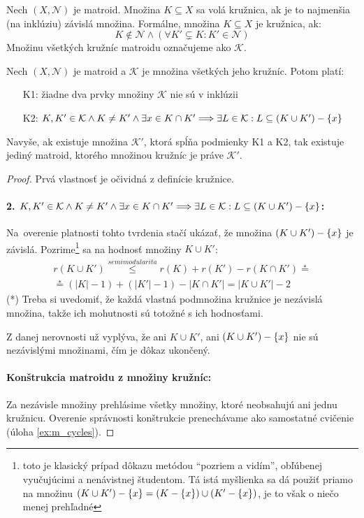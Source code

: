 \begin{definition}
Nech $(X, \mathcal{N})$ je matroid. Množina $K \subseteq X$ sa volá kružnica, ak je to najmenšia (na inklúziu) závislá množina. Formálne,
množina $K \subseteq X$ je kružnica, ak:
$$ K \not\in\mathcal{N} \wedge \left(\forall K' \subsetneq K: K' \in\mathcal{N} \right)$$ 
\noindent
Množinu všetkých kružníc matroidu označujeme ako $\mathcal{K}$.
\end{definition}

\begin{theorem}
\label{th:m_cycles}
Nech $(X, \mathcal{N})$ je matroid a $\mathcal{K}$ je množina všetkých jeho kružníc. Potom platí:
\begin{enumerate}
    \item[K1:] žiadne dva prvky množiny $\mathcal{K}$ nie sú v inklúzii
    \item[K2:] $K, K' \in \mathcal{K} \wedge K \neq K' \wedge \exists x \in K \cap K' \Longrightarrow \exists L \in \mathcal{K}: L \subseteq (K \cup K') - \left\{x\right\}$
\end{enumerate}

Navyše, ak existuje množina $\mathcal{K}'$, ktorá spĺňa podmienky K1 a K2, tak existuje jediný matroid, ktorého množinou kružníc je práve $\mathcal{K}'$.
\end{theorem}
\begin{proof}
Prvá vlastnosť je očividná z definície kružnice.
\paragraph{2. $K, K' \in \mathcal{K} \wedge K \neq K' \wedge \exists x \in K \cap K' \Longrightarrow \exists L \in \mathcal{K}: L \subseteq (K \cup K') - \left\{x\right\}$:}
Na~overenie platnosti tohto tvrdenia stačí ukázať, že množina $(K \cup K') - \left\{x\right\}$ je závislá.
Pozrime\footnote{toto je klasický prípad dôkazu metódou ``pozriem a vidím'', obľúbenej vyučujúcimi a nenávistnej študentom. Tá istá myšlienka sa dá použiť priamo na množinu $(K \cup K') - \left\{x\right\} = (K - \left\{x\right\}) \cup (K' - \left\{x\right\})$, je to však o niečo menej prehľadné} sa na hodnosť množiny $K \cup K'$:
\begin{multline*}
r(K \cup K') \overset{semimodularita}{\leq} r(K) + r(K') - r(K \cap K')  \overset{*}{=} \\ \overset{*}{=}  (|K| - 1) + (|K'| - 1) - |K \cap K'| = |K \cup K'| - 2  
\end{multline*}
(*) Treba si uvedomiť, že každá vlastná podmnožina kružnice je nezávislá množina, takže ich mohutnosti sú totožné s ich hodnosťami. 

Z danej nerovnosti už vyplýva, že ani $K \cup K'$, ani $(K \cup K') - \left\{x\right\}$ nie sú nezávislými množinami, čím je dôkaz ukončený.
\paragraph{Konštrukcia matroidu z množiny kružníc:}
Za nezávisle množiny prehlásime všetky množiny, ktoré neobsahujú ani jednu kružnicu.
Overenie správnosti konštrukcie prenechávame ako samostatné cvičenie (úloha \ref{ex:m_cycles}).
\end{proof}

